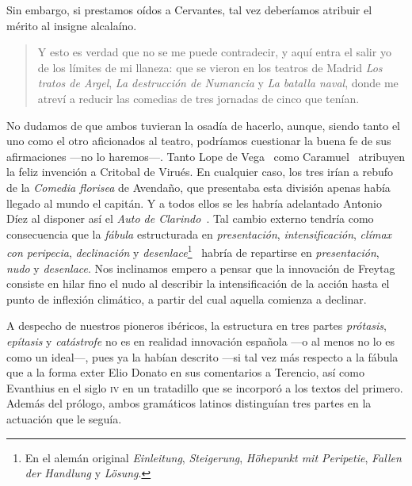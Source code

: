 Sin embargo, si prestamos oídos a Cervantes, tal vez deberíamos atribuir el mérito al insigne alcalaíno. 
 
\blockquote{Y esto es verdad que no se me puede contradecir, y aquí entra el salir yo de los límites de mi llaneza: que se vieron en los teatros de Madrid \textit{Los tratos de Argel}, \textit{La destrucción de Numancia} y \textit{La batalla naval}, donde me atreví a reducir las comedias de tres jornadas de cinco que tenían. \parencite[94-95]{cervantes2016a}}.

No dudamos de que ambos tuvieran la osadía de hacerlo, aunque, siendo tanto el uno como el otro aficionados al teatro, podríamos cuestionar la buena fe de sus afirmaciones —\nolinebreak no lo haremos\nolinebreak—\nolinebreak. Tanto Lope de Vega~\parencite*[215-217]{vega2006} como Caramuel~\parencite*{caramuel2011} atribuyen la feliz invención a Critobal de Virués. En cualquier caso, los tres irían a rebufo de la \textit{Comedia florisea} de Avendaño, que presentaba esta división apenas había llegado al mundo el capitán. Y a todos ellos se les habría adelantado Antonio Díez al disponer así el \textit{Auto de Clarindo}~\parencite[172]{kayser1992}. Tal cambio externo tendría como consecuencia que la \textit{fábula} estructurada en \textit{presentación}, \textit{intensificación}, \textit{clímax con peripecia}, \textit{declinación} y \textit{desenlace}\footnote{En el alemán original \textit{Einleitung}, \textit{Steigerung}, \textit{Höhepunkt mit Peripetie}, \textit{Fallen der Handlung} y \textit{Lösung}.}~\parencite[102-122]{freytag1894} habría de repartirse en \textit{presentación}, \textit{nudo} y \textit{desenlace}. Nos inclinamos empero a pensar que la innovación de Freytag consiste en hilar fino el nudo al describir la intensificación de la acción hasta el punto de inflexión climático, a partir del cual aquella comienza a declinar.

A despecho de nuestros pioneros ibéricos, la estructura en tres partes \textit{prótasis}, \textit{epítasis} y \textit{catástrofe} no es en realidad innovación española —\nolinebreak o al menos no lo es como un ideal\nolinebreak[4]—\nolinebreak[4], pues ya la habían descrito —\nolinebreak si tal vez más respecto a la fábula que a la forma exter Elio Donato en sus comentarios a Terencio, así como Evanthius en el siglo \textsc{iv} en un tratadillo que se incorporó a los textos del primero. Además del prólogo, ambos gramáticos latinos distinguían tres partes en la actuación que le seguía.

